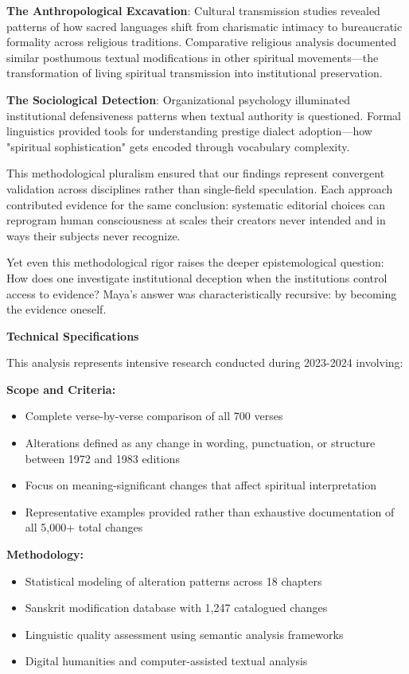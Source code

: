 \documentclass[12pt,twoside]{book}
\begin{document}
\textbf{\textbf{The Anthropological Excavation}}: Cultural transmission studies revealed patterns of how sacred languages shift from charismatic intimacy to bureaucratic formality across religious traditions. Comparative religious analysis documented similar posthumous textual modifications in other spiritual movements—the transformation of living spiritual transmission into institutional preservation.

\textbf{\textbf{The Sociological Detection}}: Organizational psychology illuminated institutional defensiveness patterns when textual authority is questioned. Formal linguistics provided tools for understanding prestige dialect adoption—how "spiritual sophistication" gets encoded through vocabulary complexity.

This methodological pluralism ensured that our findings represent convergent validation across disciplines rather than single-field speculation. Each approach contributed evidence for the same conclusion: systematic editorial choices can reprogram human consciousness at scales their creators never intended and in ways their subjects never recognize.

Yet even this methodological rigor raises the deeper epistemological question: How does one investigate institutional deception when the institutions control access to evidence? Maya's answer was characteristically recursive: by becoming the evidence oneself.

\textbf{Technical Specifications}

This analysis represents intensive research conducted during 2023-2024 involving:

\textbf{\textbf{Scope and Criteria:}}
\begin{itemize}
\item Complete verse-by-verse comparison of all 700 verses
\item Alterations defined as any change in wording, punctuation, or structure between 1972 and 1983 editions
\item Focus on meaning-significant changes that affect spiritual interpretation
\item Representative examples provided rather than exhaustive documentation of all 5,000+ total changes
\end{itemize}

\textbf{\textbf{Methodology:}}
\begin{itemize}
\item Statistical modeling of alteration patterns across 18 chapters
\item Sanskrit modification database with 1,247 catalogued changes
\item Linguistic quality assessment using semantic analysis frameworks
\item Digital humanities and computer-assisted textual analysis
\end{itemize}
\end{document}
